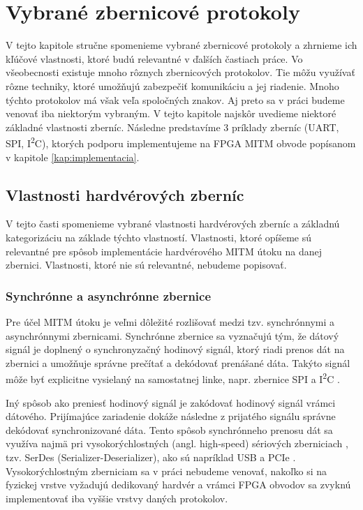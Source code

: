 \chapter{Vybrané zbernicové protokoly}
\label{kap:zbernice}

V tejto kapitole stručne spomenieme vybrané zbernicové protokoly a zhrnieme ich kľúčové vlastnosti, ktoré budú relevantné v ďalších častiach práce. Vo všeobecnosti existuje mnoho rôznych zbernicových protokolov. Tie môžu využívať rôzne techniky, ktoré umožňujú zabezpečiť komunikáciu a jej riadenie. Mnoho týchto protokolov má však veľa spoločných znakov. Aj preto sa v práci budeme venovať iba niektorým vybraným. V tejto kapitole najskôr uvedieme niektoré základné vlastnosti zberníc. Následne predstavíme 3 príklady zberníc (UART, SPI, I\textsuperscript{2}C), ktorých podporu implementujeme na FPGA MITM obvode popísanom v kapitole \ref{kap:implementacia}.

\section{Vlastnosti hardvérových zberníc}
V tejto časti spomenieme vybrané vlastnosti hardvérových zberníc a základnú kategorizáciu na základe týchto vlastností. Vlastnosti, ktoré opíšeme sú relevantné pre spôsob implementácie hardvérového MITM útoku na danej zbernici. Vlastnosti, ktoré nie sú relevantné, nebudeme popisovať.

\subsection{Synchrónne a asynchrónne zbernice}
Pre účel MITM útoku je veľmi dôležité rozlišovať medzi tzv. synchrónnymi a asynchrónnymi zbernicami. Synchrónne zbernice sa vyznačujú tým, že dátový signál je doplnený o synchronyzačný hodinový signál, ktorý riadi prenos dát na zbernici a umožňuje správne prečítať a dekódovať prenášané dáta. Takýto signál môže byť explicitne vysielaný na samostatnej linke, napr. zbernice SPI \cite{spiBus} a I\textsuperscript{2}C \cite{i2cSpec}.

Iný spôsob ako preniesť hodinový signál je zakódovať hodinový signál vrámci dátového. Prijímajúce zariadenie dokáže následne z prijatého signálu správne dekódovať synchronizované dáta. Tento spôsob synchrónneho prenosu dát sa využíva najmä pri vysokorýchlostných (angl. high-speed) sériových zberniciach \cite{serdes}, tzv. SerDes (Serializer-Deserializer), ako sú napríklad USB \cite{usbSpec} a PCIe \cite{pcieSpec}. Vysokorýchlostným zberniciam sa v práci nebudeme venovať, nakoľko si na fyzickej vrstve vyžadujú dedikovaný hardvér a vrámci FPGA obvodov sa zvyknú implementovať iba vyššie vrstvy daných protokolov.


